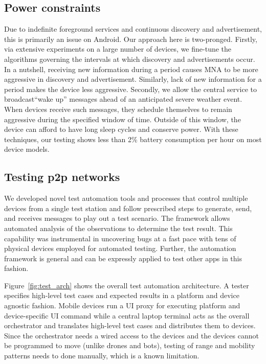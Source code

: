\documentclass[conference]{IEEEtran}
\begin{document}
%
\subsection{Power constraints}
\label{sec:power}
%
Due to indefinite foreground services and continuous discovery and
advertisement, this is primarily an issue on Android. Our approach
here is two-pronged. Firstly, via extensive experiments on a large
number of devices, we fine-tune the algorithms governing the intervals
at which discovery and advertisements occur. In a nutshell, receiving
new information during a period causes MNA to be more aggressive in
discovery and advertisement. Similarly, lack of new information for a
period makes the device less aggressive. Secondly, we allow the
central service to broadcast``wake up'' messages ahead of an
anticipated severe weather event.  When devices receive such messages,
they schedule themselves to remain aggressive during the specified
window of time.  Outside of this window, the device can afford to have
long sleep cycles and conserve power. With these techniques, our
testing shows less than 2\% battery consumption per hour on most
device models.
%
\subsection{Testing p2p networks}
\label{sec:texting}
%
We developed novel test automation tools and processes that control
multiple devices from a single test station and follow prescribed
steps to generate, send, and receives messages to play out a test
scenario.  The framework allows automated analysis of the observations
to determine the test result. This capability was instrumental in
uncovering bugs at a fast pace with tens of physical devices employed
for automated testing.  Further, the automation framework is general
and can be expressly applied to test other apps in this fashion.

Figure~\ref{fig:test_arch} shows the overall test automation
architecture. A tester specifies high-level test cases and expected
results in a platform and device agnostic fashion. Mobile devices run
a UI proxy for executing platform and device-specific UI command while
a central laptop terminal acts as the overall orchestrator and
translates high-level test cases and distributes them to
devices. Since the orchestrator needs a wired access to the devices
and the devices cannot be programmed to move (unlike drones and bots),
testing of range and mobility patterns needs to done manually, which
is a known limitation.
\end{document}

